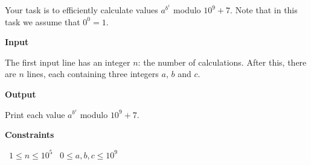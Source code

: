 Your task is to efficiently calculate values $a^{b^c}$ modulo $10^9+7$.
Note that in this task we assume that $0^0=1$.

\vspace{0.3cm}\noindent\textbf{Input}

The first input line has an integer $n$: the number of calculations.
After this, there are $n$ lines, each containing three integers $a$, $b$ and $c$.

\vspace{0.3cm}\noindent\textbf{Output}

Print each value $a^{b^c}$ modulo $10^9+7$.

\vspace{0.3cm}\noindent\textbf{Constraints}

\textbullet\ $1 \le n \le 10^5$
\textbullet\ $0 \le a,b,c \le 10^9$
